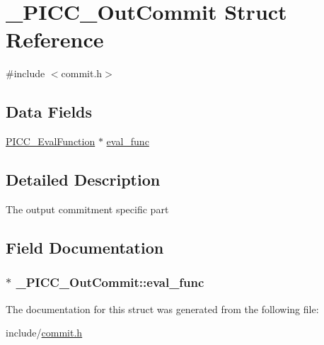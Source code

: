 \hypertarget{struct__PICC__OutCommit}{\section{\-\_\-\-P\-I\-C\-C\-\_\-\-Out\-Commit Struct Reference}
\label{struct__PICC__OutCommit}
}


{\ttfamily \#include $<$commit.\-h$>$}

\subsection*{Data Fields}
{\bf }\par
\begin{DoxyCompactItemize}
\item 
\hyperlink{commit_8h_ad2bb1ba499a64c4eb87962523a3957ab}{P\-I\-C\-C\-\_\-\-Eval\-Function} $\ast$ \hyperlink{struct__PICC__OutCommit_a598ca6a884ab33ac8e18a2236d19da5b}{eval\-\_\-func}
\end{DoxyCompactItemize}



\subsection{Detailed Description}
The output commitment specific part 

\subsection{Field Documentation}
\hypertarget{struct__PICC__OutCommit_a598ca6a884ab33ac8e18a2236d19da5b}{
\subsubsection[{eval\-\_\-func}]{$\ast$ \-\_\-\-P\-I\-C\-C\-\_\-\-Out\-Commit\-::eval\-\_\-func}}\label{struct__PICC__OutCommit_a598ca6a884ab33ac8e18a2236d19da5b}


The documentation for this struct was generated from the following file\-:\begin{DoxyCompactItemize}
\item 
include/\hyperlink{commit_8h}{commit.\-h}\end{DoxyCompactItemize}
